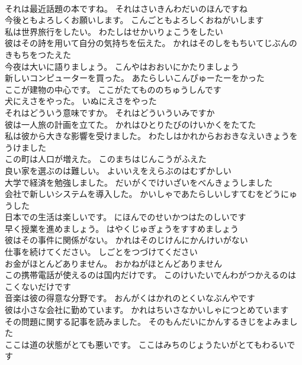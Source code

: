 \documentclass[8pt]{extreport}
\begin{document}
\begin{CJK}{UTF8}{min}
\\	それは最近話題の本ですね。	それはさいきんわだいのほんですね 
\\	今後ともよろしくお願いします。	こんごともよろしくおねがいします 
\\	私は世界旅行をしたい。	わたしはせかいりょこうをしたい 
\\	彼はその詩を用いて自分の気持ちを伝えた。	かれはそのしをもちいてじぶんのきもちをつたえた 
\\	今夜は大いに語りましょう。	こんやはおおいにかたりましょう 
\\	新しいコンピューターを買った。	あたらしいこんぴゅーたーをかった 
\\	ここが建物の中心です。	ここがたてもののちゅうしんです 
\\	犬にえさをやった。	いぬにえさをやった 
\\	それはどういう意味ですか。	それはどういういみですか 
\\	彼は一人旅の計画を立てた。	かれはひとりたびのけいかくをたてた 
\\	私は彼から大きな影響を受けました。	わたしはかれからおおきなえいきょうをうけました 
\\	この町は人口が増えた。	このまちはじんこうがふえた 
\\	良い家を選ぶのは難しい。	よいいえをえらぶのはむずかしい 
\\	大学で経済を勉強しました。	だいがくでけいざいをべんきょうしました 
\\	会社で新しいシステムを導入した。	かいしゃであたらしいしすてむをどうにゅうした 
\\	日本での生活は楽しいです。	にほんでのせいかつはたのしいです 
\\	早く授業を進めましょう。	はやくじゅぎょうをすすめましょう 
\\	彼はその事件に関係がない。	かれはそのじけんにかんけいがない 
\\	仕事を続けてください。	しごとをつづけてください 
\\	お金がほとんどありません。	おかねがほとんどありません 
\\	この携帯電話が使えるのは国内だけです。	このけいたいでんわがつかえるのはこくないだけです 
\\	音楽は彼の得意な分野です。	おんがくはかれのとくいなぶんやです 
\\	彼は小さな会社に勤めています。	かれはちいさなかいしゃにつとめています 
\\	その問題に関する記事を読みました。	そのもんだいにかんするきじをよみました 
\\	ここは道の状態がとても悪いです。	ここはみちのじょうたいがとてもわるいです 

\end{CJK}
\end{document}
